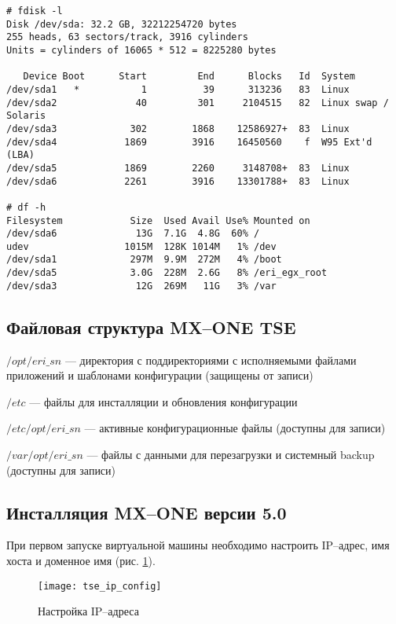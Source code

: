 \begin{lstlisting}
# fdisk -l
Disk /dev/sda: 32.2 GB, 32212254720 bytes
255 heads, 63 sectors/track, 3916 cylinders
Units = cylinders of 16065 * 512 = 8225280 bytes

   Device Boot      Start         End      Blocks   Id  System
/dev/sda1   *           1          39      313236   83  Linux
/dev/sda2              40         301     2104515   82  Linux swap / Solaris
/dev/sda3             302        1868    12586927+  83  Linux
/dev/sda4            1869        3916    16450560    f  W95 Ext'd (LBA)
/dev/sda5            1869        2260     3148708+  83  Linux
/dev/sda6            2261        3916    13301788+  83  Linux

# df -h
Filesystem            Size  Used Avail Use% Mounted on
/dev/sda6              13G  7.1G  4.8G  60% /
udev                 1015M  128K 1014M   1% /dev
/dev/sda1             297M  9.9M  272M   4% /boot
/dev/sda5             3.0G  228M  2.6G   8% /eri_egx_root
/dev/sda3              12G  269M   11G   3% /var
\end{lstlisting}

\subsection{Файловая структура MX--ONE TSE}

$/opt/eri\_sn$ --- директория с поддиректориями с исполняемыми файлами приложений и шаблонами конфигурации (защищены от записи) \par
$/etc$ --- файлы для инсталляции и обновления конфигурации \par
$/etc/opt/eri\_sn$ --- активные конфигурационные файлы (доступны для записи) \par
$/var/opt/eri\_sn$ --- файлы с данными для перезагрузки и системный backup (доступны для записи) \par

\subsection{Инсталляция MX--ONE версии 5.0}

При первом запуске виртуальной машины необходимо настроить IP--адрес, имя хоста и доменное имя (рис. \ref{img:ip_config}).
\begin{figure}[ht]
  \center
  \texttt{[image: tse\_ip\_config]}
  \caption{Настройка IP--адреса}
  \label{img:ip_config}
\end{figure}

